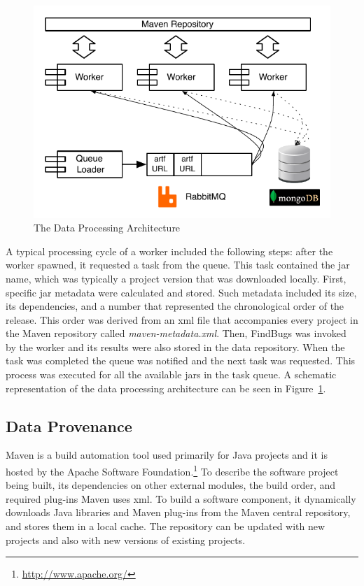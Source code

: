 \documentclass[conference]{llncs}
\begin{document}
\begin{figure}[t]
  \begin{center}
    \includegraphics[scale=0.9]{figures/arch.pdf}
  \end{center}
  \caption{The Data Processing Architecture}
  \label{fig:arch}
\end{figure}

A typical processing cycle of a worker included the following steps: after
the worker spawned, it requested a task from the queue. This task contained
the {\sc jar} name, which was typically a project version that was downloaded locally.
First, specific {\sc jar} metadata were calculated and stored. Such metadata included
its size, its dependencies, and a number that represented the chronological order of the
release. This order was derived from an {\sc xml} file that
accompanies every project in the Maven repository called {\it
maven-metadata.xml}. Then, FindBugs was invoked by the worker and its results were
also stored in the data repository. When the task was completed the queue
was notified and the next task was requested. This process was executed for
all the available {\sc jar}s in the task queue. A schematic representation of
the data processing architecture can be seen in Figure~\ref{fig:arch}.

\subsection{Data Provenance}
\label{sec:data}

Maven is a build automation tool used primarily for Java projects and it is
hosted by the Apache Software Foundation.\footnote{\url{http://www.apache.org/}}
To describe the software project being built, its dependencies
on other external modules, the build order, and required plug-ins Maven uses
{\sc xml}. To build a software component, it dynamically downloads Java libraries
and Maven plug-ins from the Maven central repository,
and stores them in a local cache. The repository can be updated with
new projects and also with new versions of existing projects.
\end{document}
